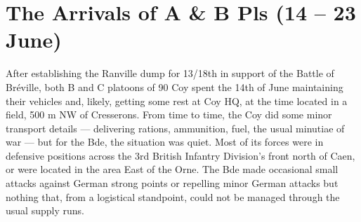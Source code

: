 \documentclass[noraggedright]{turabian-researchpaper}
\begin{document}



\section{The Arrivals of A \& B Pls (14 -- 23 June)}

After establishing the Ranville dump for 13/18th in support of
the Battle of Bréville, both B and C platoons of 90 Coy spent the 14th of June 
maintaining their vehicles and, likely, getting some rest at Coy HQ, at the
time located in a field, 500 m NW of Cresserons.  From time to time, the Coy
did some minor transport details --- delivering rations, ammunition, fuel, the
usual minutiae of war --- but for the Bde, the situation was quiet.  %
Most of its forces were in defensive positions 
across the 3rd British Infantry Division's front north of Caen, or were located
in the area East of the Orne.  The Bde made occasional small attacks
against German strong points or repelling minor German attacks but nothing 
that, from a logistical standpoint, could not be managed through the usual 
supply runs.
\end{document}
